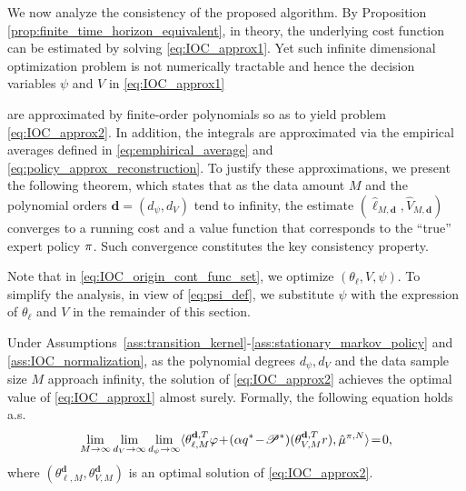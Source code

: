 

We now analyze the consistency of the proposed algorithm. 
By Proposition \ref{prop:finite_time_horizon_equivalent}, in theory, the underlying cost function can be estimated by solving \eqref{eq:IOC_approx1}. Yet such infinite dimensional optimization problem is not numerically tractable and hence the decision variables $\psi$ and $V$ in \eqref{eq:IOC_approx1}

are approximated by finite-order polynomials so as to yield problem \eqref{eq:IOC_approx2}. In addition, the integrals are approximated via the empirical averages defined in \eqref{eq:emphirical_average} and \eqref{eq:policy_approx_reconstruction}. To justify these approximations, we present the following theorem, which states that as the data amount $M$ and the polynomial orders $\mathbf{d}=(d_\psi, d_V)$ tend to infinity, the estimate $(\hat{\ell}_{M,\mathbf{d}}, \hat{V}_{M,\mathbf{d}})$ converges to a running cost and a value function that corresponds to the ``true'' expert policy $\relax{\pi}$. Such convergence constitutes the key consistency property.



\begin{remark}
Note that in \eqref{eq:IOC_origin_cont_func_set}, we optimize $(\theta_\ell, V, \psi)$.
To simplify the analysis, in view of \eqref{eq:psi_def}, we substitute $\psi$ with the expression of $\theta_\ell$ and $V$ in the remainder of this section. 
\end{remark}


\begin{theorem}\label{thm: MAIN-CONSISTENCY-THEOREM}
    Under Assumptions~\ref{ass:transition_kernel}-\ref{ass:stationary_markov_policy} and \ref{ass:IOC_normalization}, as the polynomial degrees $d_\psi, d_V$ and the data sample size $M$ approach infinity, the solution of \eqref{eq:IOC_approx2} achieves the optimal value of \eqref{eq:IOC_approx1} almost surely. Formally, the following equation holds a.s. 
    \begin{equation*}
        \begin{aligned}
            \lim_{M\rightarrow\infty}\lim_{d_V\rightarrow\infty}\lim_{d_\psi\rightarrow\infty} \langle\theta_{\ell, M}^{\mathbf{d},T}\varphi\!+\!(\alpha q^*\!-\!\mathscr{P}^*)(\theta_{V, M}^{\mathbf{d},T}r),\hat{\mu}^{\relax{\pi}, N} \rangle\!=\!0,
        \end{aligned}
    \end{equation*}
    where $(\theta_{\ell, M}^{\mathbf{d}}, \theta_{V, M}^{\mathbf{d}})$ is an optimal solution of \eqref{eq:IOC_approx2}. 
\end{theorem}

